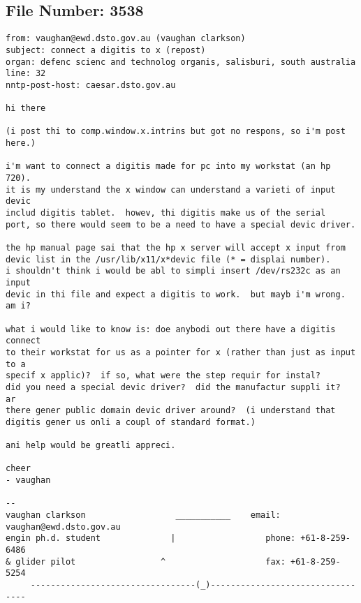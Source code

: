 \subsection{File Number: 3538}
\begin{verbatim}
from: vaughan@ewd.dsto.gov.au (vaughan clarkson)
subject: connect a digitis to x (repost)
organ: defenc scienc and technolog organis, salisburi, south australia
line: 32
nntp-post-host: caesar.dsto.gov.au

hi there

(i post thi to comp.window.x.intrins but got no respons, so i'm post
here.)

i'm want to connect a digitis made for pc into my workstat (an hp 720).
it is my understand the x window can understand a varieti of input devic
includ digitis tablet.  howev, thi digitis make us of the serial
port, so there would seem to be a need to have a special devic driver.

the hp manual page sai that the hp x server will accept x input from
devic list in the /usr/lib/x11/x*devic file (* = displai number).
i shouldn't think i would be abl to simpli insert /dev/rs232c as an input
devic in thi file and expect a digitis to work.  but mayb i'm wrong.  am i?

what i would like to know is: doe anybodi out there have a digitis connect
to their workstat for us as a pointer for x (rather than just as input to a
specif x applic)?  if so, what were the step requir for instal?
did you need a special devic driver?  did the manufactur suppli it?  ar
there gener public domain devic driver around?  (i understand that
digitis gener us onli a coupl of standard format.)

ani help would be greatli appreci.

cheer
- vaughan

-- 
vaughan clarkson                  ___________    email: vaughan@ewd.dsto.gov.au
engin ph.d. student              |                  phone: +61-8-259-6486
& glider pilot			       ^                    fax: +61-8-259-5254
     ---------------------------------(_)---------------------------------
\end{verbatim}
